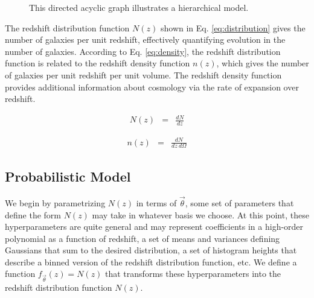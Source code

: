 \documentclass[preprint]{aastex}
\begin{document}
\begin{figure}
\vspace{0.5cm}
\begin{center}
\caption{This directed acyclic graph illustrates a hierarchical model.}
\label{fig:flow}
\end{center}
\end{figure}

The redshift distribution function $N(z)$ shown in Eq. \ref{eq:distribution} gives the number of galaxies per unit redshift, effectively quantifying evolution in the number of galaxies.  \citep{men13}  According to Eq. \ref{eq:density}, the redshift distribution function is related to the redshift density function $n(z)$, which gives the number of galaxies per unit redshift per unit volume.  The redshift density function provides additional information about cosmology via the rate of expansion over redshift.

\begin{eqnarray}
\label{eq:distribution}
N(z) &=& \frac{dN}{dz}
\end{eqnarray}

\begin{eqnarray}
\label{eq:density}
n(z) &=& \frac{dN}{dz\ d\Omega}
\end{eqnarray}

\clearpage
\subsection{Probabilistic Model}
\label{sec:prob}

We begin by parametrizing $N(z)$ in terms of $\vec{\theta}$, some set of parameters that define the form $N(z)$ may take in whatever basis we choose.  At this point, these hyperparameters are quite general and may represent coefficients in a high-order polynomial as a function of redshift, a set of means and variances defining Gaussians that sum to the desired distribution, a set of histogram heights that describe a binned version of the redshift distribution function, etc.  We define a function $f_{\vec{\theta}}(z)=N(z)$ that transforms these hyperparameters into the redshift distribution function $N(z)$.
\end{document}
